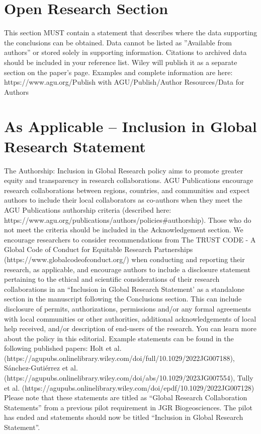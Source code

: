 \documentclass[draft]{agujournal2019}
\begin{document}
%
%

\section*{Open Research Section}
This section MUST contain a statement that describes where the data supporting the conclusions can be obtained. Data cannot be listed as ''Available from authors'' or stored solely in supporting information. Citations to archived data should be included in your reference list. Wiley will publish it as a separate section on the paper’s page. Examples and complete information are here:
https://www.agu.org/Publish with AGU/Publish/Author Resources/Data for Authors

\section*{As Applicable – Inclusion in Global Research Statement}
The Authorship: Inclusion in Global Research policy aims to promote greater equity and transparency in research collaborations. AGU Publications encourage research collaborations between regions, countries, and communities and expect authors to include their local collaborators as co-authors when they meet the AGU Publications authorship criteria (described here: https://www.agu.org/publications/authors/policies\#authorship). Those who do not meet the criteria should be included in the Acknowledgement section. We encourage researchers to consider recommendations from The TRUST CODE - A Global Code of Conduct for Equitable Research Partnerships (https://www.globalcodeofconduct.org/) when conducting and reporting their research, as applicable, and encourage authors to include a disclosure statement pertaining to the ethical and scientific considerations of their research collaborations in an “Inclusion in Global Research Statement’ as a standalone section in the manuscript following the Conclusions section. This can include disclosure of permits, authorizations, permissions and/or any formal agreements with local communities or other authorities, additional acknowledgements of local help received, and/or description of end-users of the research. You can learn more about the policy in this editorial. Example statements can be found in the following published papers: 
Holt et al. (https://agupubs.onlinelibrary.wiley.com/doi/full/10.1029/2022JG007188), 
Sánchez-Gutiérrez et al. (https://agupubs.onlinelibrary.wiley.com/doi/abs/10.1029/2023JG007554), 
Tully et al. (https://agupubs.onlinelibrary.wiley.com/doi/epdf/10.1029/2022JG007128) 
Please note that these statements are titled as “Global Research Collaboration Statements” from a previous pilot requirement in JGR Biogeosciences. The pilot has ended and statements should now be titled “Inclusion in Global Research Statement”.
\end{document}
